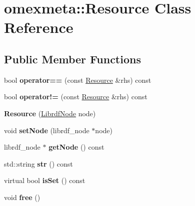 \hypertarget{classomexmeta_1_1Resource}{}\section{omexmeta\+:\+:Resource Class Reference}
\label{classomexmeta_1_1Resource}
\subsection*{Public Member Functions}
\begin{DoxyCompactItemize}
\item 
\mbox{\label{classomexmeta_1_1Resource_ade5147df30b7e4f42386534a4a27b12f}} 
bool {\bfseries operator==} (const \hyperlink{classomexmeta_1_1Resource}{Resource} \&rhs) const
\item 
\mbox{\label{classomexmeta_1_1Resource_a99336c4dd6ef49588cd7144e50cf639b}} 
bool {\bfseries operator!=} (const \hyperlink{classomexmeta_1_1Resource}{Resource} \&rhs) const
\item 
\mbox{\label{classomexmeta_1_1Resource_a6b70255d34f54c4adfa893a8ba54b0a2}} 
{\bfseries Resource} (\hyperlink{classredland_1_1LibrdfNode}{Librdf\+Node} node)
\item 
\mbox{\label{classomexmeta_1_1Resource_a25be1a34d6a27565612a9c7b597befd8}} 
void {\bfseries set\+Node} (librdf\+\_\+node $\ast$node)
\item 
\mbox{\label{classomexmeta_1_1Resource_a7866b5bd47b319e39dec70eae8969d4f}} 
librdf\+\_\+node $\ast$ {\bfseries get\+Node} () const
\item 
\mbox{\label{classomexmeta_1_1Resource_aae0948ff89d537133fd5e99bb88aa96a}} 
std\+::string {\bfseries str} () const
\item 
\mbox{\label{classomexmeta_1_1Resource_ad6a1a5009a2b8fdacf0f53899986735a}} 
virtual bool {\bfseries is\+Set} () const
\item 
\mbox{\label{classomexmeta_1_1Resource_a87a7540d96d762dbd3f0b5160e575803}} 
void {\bfseries free} ()
\end{DoxyCompactItemize}
